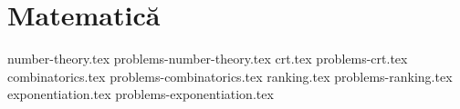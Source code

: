 \part{Matematică}

{number-theory.tex}
{problems-number-theory.tex}
{crt.tex}
{problems-crt.tex}
{combinatorics.tex}
{problems-combinatorics.tex}
{ranking.tex}
{problems-ranking.tex}
{exponentiation.tex}
{problems-exponentiation.tex}

